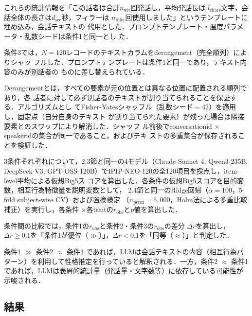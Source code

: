\documentclass[dvipdfmx,11pt,a4paper]{bxjsarticle}
\renewcommand{\_}{\paperorigunderscore\allowbreak}%
\begin{document}
これらの統計情報を「この話者は合計$n_{\text{utt}}$回発話し，平均発話長は
$\bar{l}_{\text{chars}}$文字，会話全体の長さは$d_{\text{sec}}$秒，フィラーは
$n_{\text{filler}}$回使用しました」というテンプレートに埋め込み，会話テキストの
代用とした．プロンプトテンプレート・温度パラメータ・乱数シードは条件1と同一とし
た．

条件3では，$N = 120$レコードのテキストカラムをderangement（完全順列）によりシャッ
フルした．プロンプトテンプレートは条件1と同一であり，テキスト内容のみが別話者の
ものに差し替えられている．

Derangementとは，すべての要素が元の位置とは異なる位置に配置される順列であり，各
話者に対して必ず別話者のテキストが割り当てられることを保証する．アルゴリズムとし
てFisher-Yatesシャッフル（乱数シード$= 42$）を適用し，固定点（自分自身のテキスト
が割り当てられた要素）が残った場合は隣接要素とのスワップにより解消した．シャッフ
ル前後でconversation\_id $\times$ speaker\_idの集合が同一であること，およびテキ
ストの多重集合が保存されることを検証した．

3条件それぞれについて，2.3節と同一の4モデル（Claude Sonnet 4, Qwen3-235B, DeepSeek-V3,
GPT-OSS-120B）でIPIP-NEO-120の全120項目を採点し，item-level平均による仮想Big5ス
コアを算出した．各条件の仮想Big5スコアを目的変数，相互行為特徴量を説明変数として，
2.4節と同一のRidge回帰（$\alpha = 100$，5-fold subject-wise CV）および置換検定
（$n_{\text{perm}} = 5{,}000$，Holm法による多重比較補正）を実行し，各条件
$\times$各traitの$r_{\text{obs}}$と$p$値を算出した．


条件間の比較では，条件1の$r_{\text{obs}}$と条件2・条件3の$r_{\text{obs}}$の差分
$\Delta r$を算出し，$\Delta r \geq 0.1$を「条件1が優位（$\gg$）」，$\Delta r <
0.1$を「同等（$\approx$）」と判定した．

条件1 $\gg$ 条件2 $\approx$ 条件3 であれば，LLMは会話テキストの内容（相互行為パ
ターン）を利用して性格推定を行っていると解釈される．一方，条件2 $\approx$ 条件1
であれば，LLMは表層的統計量（発話量・文字数等）に依存している可能性が示唆される．


\subsection{結果}
\label{sec:result_baseline}
\end{document}
